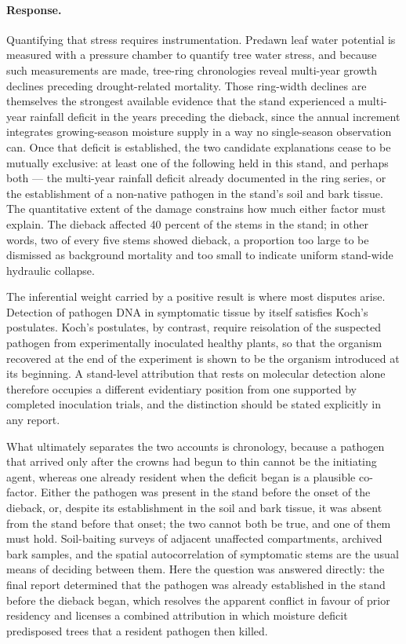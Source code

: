 \documentclass[11pt]{article}
\begin{document}
\paragraph{Response.} {\small Quantifying that stress requires instrumentation. Predawn leaf water potential is measured with a pressure chamber to quantify tree water stress, and because such measurements are made, tree-ring chronologies reveal multi-year growth declines preceding drought-related mortality. Those ring-width declines are themselves the strongest available evidence that the stand experienced a multi-year rainfall deficit in the years preceding the dieback, since the annual increment integrates growing-season moisture supply in a way no single-season observation can. Once that deficit is established, the two candidate explanations cease to be mutually exclusive: at least one of the following held in this stand, and perhaps both — the multi-year rainfall deficit already documented in the ring series, or the establishment of a non-native pathogen in the stand's soil and bark tissue. The quantitative extent of the damage constrains how much either factor must explain. The dieback affected 40 percent of the stems in the stand; in other words, two of every five stems showed dieback, a proportion too large to be dismissed as background mortality and too small to indicate uniform stand-wide hydraulic collapse.

The inferential weight carried by a positive result is where most disputes arise. Detection of pathogen DNA in symptomatic tissue by itself satisfies Koch's postulates. Koch's postulates, by contrast, require reisolation of the suspected pathogen from experimentally inoculated healthy plants, so that the organism recovered at the end of the experiment is shown to be the organism introduced at its beginning. A stand-level attribution that rests on molecular detection alone therefore occupies a different evidentiary position from one supported by completed inoculation trials, and the distinction should be stated explicitly in any report.

What ultimately separates the two accounts is chronology, because a pathogen that arrived only after the crowns had begun to thin cannot be the initiating agent, whereas one already resident when the deficit began is a plausible co-factor. Either the pathogen was present in the stand before the onset of the dieback, or, despite its establishment in the soil and bark tissue, it was absent from the stand before that onset; the two cannot both be true, and one of them must hold. Soil-baiting surveys of adjacent unaffected compartments, archived bark samples, and the spatial autocorrelation of symptomatic stems are the usual means of deciding between them. Here the question was answered directly: the final report determined that the pathogen was already established in the stand before the dieback began, which resolves the apparent conflict in favour of prior residency and licenses a combined attribution in which moisture deficit predisposed trees that a resident pathogen then killed.

}
\end{document}
